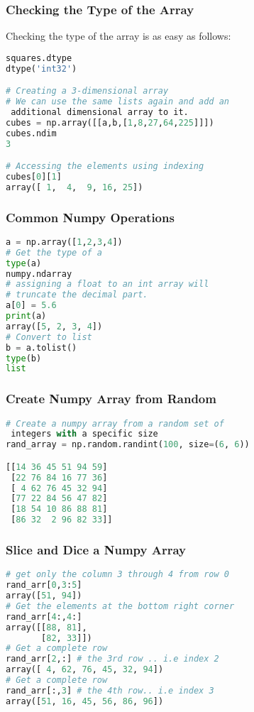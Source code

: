 \documentclass{beamer}
\begin{document}
\begin{frame}[fragile]
\frametitle{Checking the Type of the Array}
Checking the type of the array is as easy as follows:
\begin{lstlisting}[language=Python]
squares.dtype
dtype('int32')

# Creating a 3-dimensional array
# We can use the same lists again and add an
 additional dimensional array to it.
cubes = np.array([[a,b,[1,8,27,64,225]]])
cubes.ndim
3

# Accessing the elements using indexing
cubes[0][1]
array([ 1,  4,  9, 16, 25])
\end{lstlisting}
\end{frame}

\begin{frame}[fragile]
\frametitle{Common Numpy Operations}

\begin{lstlisting}[language=Python]
a = np.array([1,2,3,4])
# Get the type of a 
type(a)
numpy.ndarray
# assigning a float to an int array will
# truncate the decimal part.
a[0] = 5.6
print(a)
array([5, 2, 3, 4])
# Convert to list
b = a.tolist()
type(b)
list

\end{lstlisting}
\end{frame}


\begin{frame}[fragile]
\frametitle{Create Numpy Array from Random}
\begin{lstlisting}[language=Python]
# Create a numpy array from a random set of
 integers with a specific size
rand_array = np.random.randint(100, size=(6, 6))

[[14 36 45 51 94 59]
 [22 76 84 16 77 36]
 [ 4 62 76 45 32 94]
 [77 22 84 56 47 82]
 [18 54 10 86 88 81]
 [86 32  2 96 82 33]]
\end{lstlisting}
\end{frame}

\begin{frame}[fragile]
\frametitle{Slice and Dice a Numpy Array}
\begin{lstlisting}[language=Python]
# get only the column 3 through 4 from row 0
rand_arr[0,3:5] 
array([51, 94])
# Get the elements at the bottom right corner
rand_arr[4:,4:]
array([[88, 81],
       [82, 33]])
# Get a complete row
rand_arr[2,:] # the 3rd row .. i.e index 2
array([ 4, 62, 76, 45, 32, 94])
# Get a complete row 
rand_arr[:,3] # the 4th row.. i.e index 3
array([51, 16, 45, 56, 86, 96])
\end{lstlisting}
\end{frame}
\end{document}
